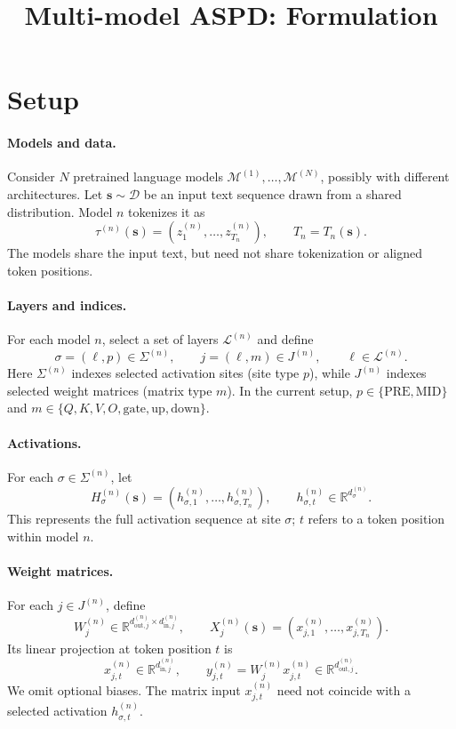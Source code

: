 \documentclass[11pt,a4paper]{article}
\title{Multi-model ASPD: Formulation}
\author{}
\date{}
\newcommand{\RR}{\mathbb{R}}
\begin{document}
\maketitle

\section{Setup}

\paragraph{Models and data.}
Consider $N$ pretrained language models $\mathcal M^{(1)},\ldots,
\mathcal M^{(N)}$, possibly with different architectures.
Let $\mathbf s\sim\mathcal D$ be an input text sequence drawn from a
shared distribution. Model $n$ tokenizes it as
$$
\tau^{(n)}(\mathbf s)
=(z_1^{(n)},\ldots,z_{T_n}^{(n)}),
\qquad T_n=T_n(\mathbf s).
$$
The models share the input text, but need not share tokenization or
aligned token positions.

\paragraph{Layers and indices.}
For each model $n$, select a set of layers $\mathcal L^{(n)}$ and define
$$
\sigma=(\ell,p)\in\Sigma^{(n)},
\qquad
j=(\ell,m)\in J^{(n)},
\qquad \ell\in\mathcal L^{(n)}.
$$
Here $\Sigma^{(n)}$ indexes selected activation sites (site type $p$),
while $J^{(n)}$ indexes selected weight matrices (matrix type $m$).
In the current setup, $p\in\{\mathrm{PRE},\mathrm{MID}\}$ and
$m\in\{Q,K,V,O,\mathrm{gate},\mathrm{up},\mathrm{down}\}$.

\paragraph{Activations.}
For each $\sigma\in\Sigma^{(n)}$, let
$$
H_\sigma^{(n)}(\mathbf s)
=(h_{\sigma,1}^{(n)},\ldots,h_{\sigma,T_n}^{(n)}),
\qquad h_{\sigma,t}^{(n)}\in\RR^{d_\sigma^{(n)}}.
$$
This represents the full activation sequence at site $\sigma$;
$t$ refers to a token position within model $n$.

\paragraph{Weight matrices.}
For each $j\in J^{(n)}$, define
$$
W_j^{(n)}\in
\RR^{d_{\mathrm{out},j}^{(n)}\times d_{\mathrm{in},j}^{(n)}},
\qquad
X_j^{(n)}(\mathbf s)=(x_{j,1}^{(n)},\ldots,x_{j,T_n}^{(n)}).
$$
Its linear projection at token position $t$ is
$$
x_{j,t}^{(n)}\in\RR^{d_{\mathrm{in},j}^{(n)}},
\qquad
y_{j,t}^{(n)}=W_j^{(n)}x_{j,t}^{(n)}
\in\RR^{d_{\mathrm{out},j}^{(n)}}.
$$
We omit optional biases. The matrix input $x_{j,t}^{(n)}$ need not
coincide with a selected activation $h_{\sigma,t}^{(n)}$.
\end{document}
